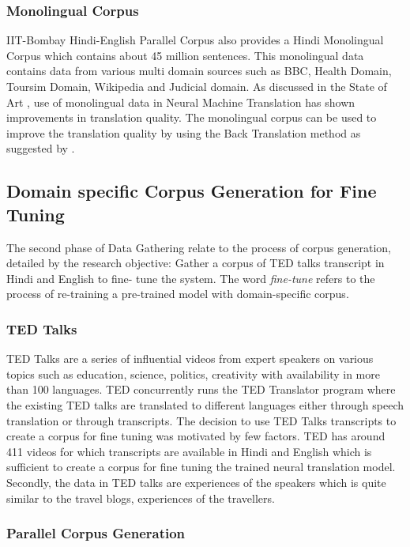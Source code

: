 \subsubsection{Monolingual Corpus}
\label{sec:mono}
IIT-Bombay Hindi-English Parallel Corpus also provides a Hindi Monolingual Corpus which contains about 45 million sentences. This monolingual data contains data from various multi domain sources such as BBC, Health Domain, Toursim Domain, Wikipedia and Judicial domain. As discussed in the State of Art , use of monolingual data in Neural Machine Translation has shown improvements in translation quality. The monolingual corpus can be used to improve the translation quality by using the Back Translation method as suggested by \cite{DBLP:journals/corr/SennrichHB15a}.

\subsection{Domain specific Corpus Generation for Fine Tuning}
The second phase of Data Gathering relate to the process of corpus generation, detailed by the research objective: Gather a corpus of TED talks transcript in Hindi and English to fine- tune the system. The word \textit{fine-tune} refers to the process of re-training a pre-trained model with domain-specific corpus.

\subsubsection{TED Talks} 
TED Talks are a series of influential videos from expert speakers on various topics such as education, science, politics, creativity with availability in more than 100 languages. TED concurrently runs the TED Translator program where the existing TED talks are translated to different languages either through speech translation or through transcripts. The decision to use TED Talks transcripts to create a corpus for fine tuning was motivated by few factors. TED has around 411 videos for which transcripts are available in Hindi and English which is sufficient to create a corpus for fine tuning the trained neural translation model. Secondly, the data in TED talks are experiences of the speakers which is quite similar to the travel blogs, experiences of the travellers. 

\subsubsection{Parallel Corpus Generation}

